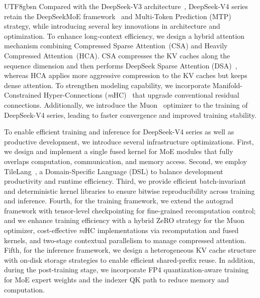 \documentclass[11pt, a4paper, logo, copyright, nonumbering]{deepseek}
\newcommand{\dsviii}{DeepSeek-V3}
\newcommand{\dsviv}{DeepSeek-V4}
\newcommand{\mhcfull}{Manifold-Constrained Hyper-Connections}
\newcommand{\mhc}{\textit{m}HC}
\newcommand{\hcafull}{Heavily Compressed Attention}
\newcommand{\hca}{HCA}
\newcommand{\csafull}{Compressed Sparse Attention}
\newcommand{\csa}{CSA}
\begin{document}
\begin{CJK*}{UTF8}{gbsn}
Compared with the \dsviii{} architecture~\citep{dsv3}, \dsviv{} series retain the DeepSeekMoE framework~\citep{deepseekmoe} and Multi-Token Prediction (MTP) strategy, while introducing several key innovations in architecture and optimization.  
To enhance long-context efficiency, we design a hybrid attention mechanism combining \csafull{}~(\csa{}) and \hcafull{}~(\hca{}). 
\csa{} compresses the KV caches along the sequence dimension and then performs DeepSeek Sparse Attention (DSA)~\citep{dsv32}, whereas \hca{} applies more aggressive compression to the KV caches but keeps dense attention.
To strengthen modeling capability, we incorporate \mhcfull{} (\mhc{})~\citep{mhc} that upgrade conventional residual connections.  
Additionally, we introduce the Muon~\citep{muon,muon_kimi} optimizer to the training of \dsviv{} series, leading to faster convergence and improved training stability.

To enable efficient training and inference for \dsviv{} series as well as productive development, we introduce several infrastructure optimizations.
First, we design and implement a single fused kernel for MoE modules that fully overlaps computation, communication, and memory access. 
Second, we employ TileLang~\citep{wangtilelang}, a Domain-Specific Language (DSL) to balance development productivity and runtime efficiency. 
Third, we provide efficient batch-invariant and deterministic kernel libraries to ensure bitwise reproducibility across training and inference. 
Fourth, for the training framework, we extend the autograd framework with tensor-level checkpointing for fine-grained recomputation control; and we enhance training efficiency with a hybrid ZeRO strategy for the Muon optimizer, cost-effective \mhc{} implementations via recomputation and fused kernels, and two-stage contextual parallelism to manage compressed attention.
Fifth, for the inference framework, we design a heterogeneous KV cache structure with on-disk storage strategies to enable efficient shared-prefix reuse.
In addition, during the post-training stage, we incorporate FP4 quantization-aware training for MoE expert weights and the indexer QK path to reduce memory and computation. 


\end{CJK*}
\end{document}
